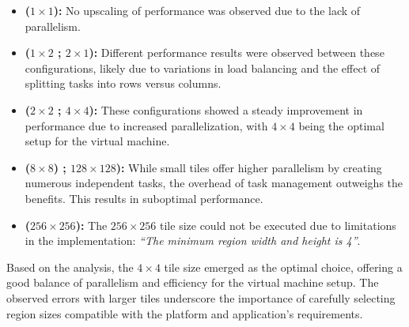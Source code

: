 \documentclass{article}
\begin{document}
\begin{itemize}
    \item \textbf{(\(1 \times 1\)):}  
    No upscaling of performance was observed due to the lack of parallelism.
    
    \item \textbf{ (\(1 \times 2\) ; \(2 \times 1\)):}  
    Different performance results were observed between these configurations, likely due to variations in load balancing and the effect of splitting tasks into rows versus columns.
    
    \item \textbf{ (\(2 \times 2\) ; \(4 \times 4\)):}  
    These configurations showed a steady improvement in performance due to increased parallelization, with \(4 \times 4\) being the optimal setup for the virtual machine.
    
    \item \textbf{ (\(8 \times 8\)) ; \(128 \times 128\)):}  
    While small tiles offer higher parallelism by creating numerous independent tasks, the overhead of task management outweighs the benefits. This results in suboptimal performance.
    

    \item \textbf{ (\(256 \times 256\)):}  
    The \(256 \times 256\) tile size could not be executed due to limitations in the implementation: \textit{``The minimum region width and height is 4''}.
\end{itemize}

\noindent Based on the analysis, the \(4 \times 4\) tile size emerged as the optimal choice, offering 
a good balance of parallelism and efficiency for the virtual machine setup. 
The observed errors with larger tiles underscore the importance of carefully selecting region 
sizes compatible with the platform and application's requirements.
\vspace{-0.5em}
\end{document}
